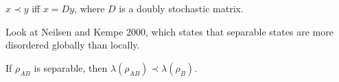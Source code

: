 \documentclass{article}
\begin{document}
  \begin{theorem}
    $x \prec y$ iff $x = D y$, where $D$ is a doubly stochastic matrix. 
  \end{theorem}

  Look at Neilsen and Kempe 2000, which states that separable states are more disordered globally than locally. 

  \begin{theorem}
    If $\rho_{AB}$ is separable, then $\lambda (\rho_{AB}) \prec \lambda (\rho_B)$. 
  \end{theorem}
\end{document}
